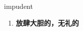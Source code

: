 
\begin{frame}
{\huge impudent}
\begin{center}
\begin{enumerate}\Large
  \item \textbf{放肆大胆的，无礼的}
\end{enumerate}
\end{center}
\end{frame}
